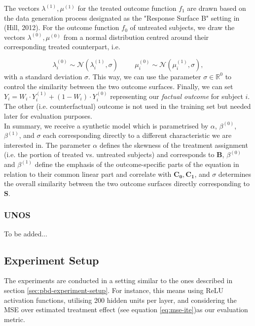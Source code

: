 The vectors $\lambda^{(1)}, \mu^{(1)}$ for the treated outcome function $f_1$ are drawn based on the data generation process designated as the "Response Surface B" setting in (Hill, 2012). For the outcome function $f_0$ of untreated subjects, we draw the vectors $\lambda^{(0)}, \mu^{(0)}$ from a normal distribution centred around their corresponding treated counterpart, i.e.    


$$\lambda^{(0)}_i \sim \mathcal{N}(\lambda^{(1)}_i, \sigma)  \hspace{1cm} \mu^{(0)}_i \sim \mathcal{N}(\mu^{(1)}_i, \sigma),
$$
with a standard deviation $\sigma$. This way, we can use the parameter $\sigma \in \mathbb{R}^0$ to control the similarity between the two outcome surfaces. 
Finally, we can set $Y_i = W_i \cdot Y^{(1)}_i + (1 - W_i) \cdot Y^{(0)}_i$ representing our \emph{factual outcome} for subject $i$. The other (i.e. counterfactual) outcome is not used in the training set but needed later for evaluation purposes. \\

In summary, we receive a synthetic model which is parametrised by $\alpha$, $\beta^{(0)}$, $\beta^{(1)}$, and $\sigma$ each corresponding directly to a different characteristic we are interested in. The parameter $\alpha$ defines the skewness of the treatment assignment (i.e. the portion of treated vs. untreated subjects) and corresponds to $\mathbf{B}$,  $\beta^{(0)}$ and $\beta^{(1)}$ define the emphasis of the outcome-specific parts of the equation in relation to their common linear part and correlate with $\mathbf{C_0}, \mathbf{C_1}$, and $\sigma$ determines the overall similarity between the two outcome surfaces directly corresponding to $\mathbf{S}$. 


\subsubsection{UNOS}
To be added... 

\subsection{Experiment Setup}
The experiments are conducted in a setting similar to the ones described in section \ref{sec:pbd-experiment-setup}. For instance, this means using ReLU activation functions, utilising 200 hidden units per layer, and considering the MSE over estimated treatment effect (see equation \ref{eq:mse-ite})as our evaluation metric. 

